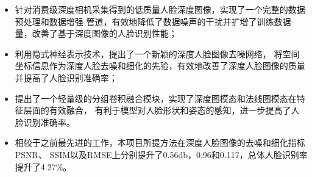 \documentclass{resume}
\begin{document}
\href{https://www.sciencedirect.com/science/article/pii/S0031320323006349}{\textcolor{linkcolor}{\faExternalLink{}}}
\begin{itemize}[parsep=1.0ex]
  \item 针对消费级深度相机采集得到的低质量人脸深度图像，实现了一个完整的数据预处理和数据增强
        管道，有效地降低了数据噪声的干扰并扩增了训练数据量，改善了基于深度图像的人脸识别性能；
  \item 利用隐式神经表示技术，提出了一个新颖的深度人脸图像去噪网络，
        将空间坐标信息作为深度人脸去噪和细化的先验，有效地改善了深度人脸图像的质量
        并提高了人脸识别准确率；
  \item 提出了一个轻量级的分组卷积融合模块，实现了深度图模态和法线图模态在特征层面的有效融合，
        有利于模型对人脸形状和姿态的感知，进一步提高了人脸识别准确率。
  \item 相较于之前最先进的工作，本项目所提方法在深度人脸图像的去噪和细化指标PSNR、
        SSIM以及RMSE上分别提升了0.56db，0.96和0.117，总体人脸识别率提升了4.27\%。
\end{itemize}
\end{document}
